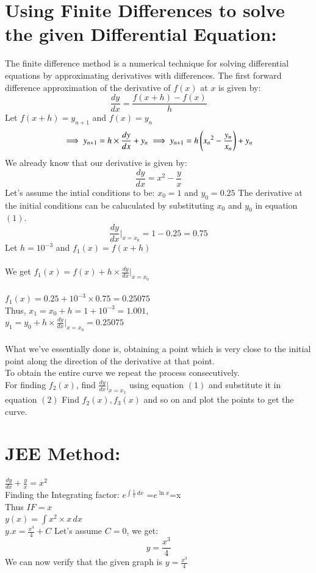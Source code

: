 \documentclass[journal]{IEEEtran}
\begin{document}
\section*{Using Finite Differences to solve the given Differential Equation: }
The finite difference method is a numerical technique for solving differential equations by approximating derivatives with differences.
The first forward difference approximation of the derivative of $f(x)$ at $x$ is given by:
\begin{equation}
    \frac{dy}{dx}=\frac{f(x+h)-f(x)}{h}
\end{equation}
Let $f(x+h)=y_{n+1}$ and $f(x)=y_n$
\begin{equation}
    \implies y_{n+1}=h\times\frac{dy}{dx}+y_n
    \implies y_{n+1}=h\left({x_n}^2-\frac{y_n}{x_n}\right)+y_n
\end{equation}
We already know that our derivative is given by:
$$\frac{dy}{dx}=x^2-\frac{y}{x}$$
Let's assume the intial conditions to be: $x_0=1$ and $y_0=0.25$
The derivative at the initial conditions can be caluculated by substituting $x_0$ and $y_0$ in equation $(1)$.\\
$$\frac{dy}{dx}|_{x=x_0}=1-0.25 =0.75$$
Let $h=10^{-3}$ and $f_1(x)=f(x+h)$\\\\
We get $f_1(x)=f(x)+h\times\frac{dy}{dx}|_{x=x_0} $\\\\
$f_1(x)=0.25+10^{-3}\times0.75=0.25075$\\
Thus, $x_1=x_0+h=1+10^{-3}=1.001$,\\$y_1=y_0+h\times\frac{dy}{dx}|_{x=x_0}=0.25075$\\\\
What we've essentially done is, obtaining a point which is very close to the initial point along the direction of the derivative at that point.\\To obtain the entire curve we repeat the process consecutively.\\For finding $f_2(x)$, find $\frac{dy}{dx}|_{x=x_1}$ using equation $(1)$ and substitute it in equation $(2)$ Find $f_2(x), f_3(x)$ and so on and plot the points to get the curve.
\section*{JEE Method:}
$\frac{dy}{dx}+\frac{y}{x}=x^2$\\
Finding the Integrating factor:
$e^{\int \frac{1}{x} \, dx}$ =$e^{\ln{x}}$=x\\
Thus $IF = x$ \\
$y(x)=\int x^2\times x\, dx$\\
$y.x = \frac{x^4}{4}+C$
Let's assume $C=0$, we get:\\
$$y=\frac{x^3}{4}$$
We can now verify that the given graph is $y=\frac{x^3}{4}$
\end{document}
